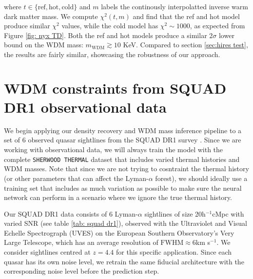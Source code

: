 where $t\in \{\mathrm{ref}, \mathrm{hot}, \mathrm{cold} \}$ and $m$ labels the continously interpolatted inverse warm dark matter mass. We compute $\chi^2(t,m)$ and find that the ref and hot model produce similar $\chi^2$ values, while the cold model has $\chi^2 \sim 1000$, as expected from Figure \ref{fig: nyx TD}. Both the ref and hot models produce a similar $2\sigma$ lower bound on the WDM mass: $m_{\mathrm{WDM}} \gtrsim 10$ KeV. Compared to section \ref{sec:hires test}, the results are fairly similar, showcasing the robustness of our approach.
































\section{WDM constraints from SQUAD DR1 observational data}\label{sec:inference squad}
We begin applying our density recovery and WDM mass inference pipeline to a set of 6 observed quasar sightlines from the SQUAD DR1 survey \cite{Murphy_2018}. Since we are working with observational data, we will always train the model with the complete \texttt{SHERWOOD THERMAL} dataset that includes varied thermal histories and WDM masses. Note that since we are not trying to cosntraint the thermal history (or other parameters that can affect the Lyman-$\alpha$ forest), we should ideally use a training set that includes as much variation as possible to make sure the neural network can perform in a scenario where we ignore the true thermal history.

Our SQUAD DR1  data consists of 6 Lyman-$\alpha$ sightlines of size 20h$^{-1}$cMpc with varied SNR (see table \ref{tab: squad dr1}), observed with the Ultraviolet and Visual Echelle Spectrograph (UVES) on the European Southern Observatory’s Very Large Telescope, which has an average resolution of $\mathrm{FWHM}\approx 6$km s$^{-1}$. We consider sightlines centred at $z=4.4$ for this specific application. Since each quasar has its own noise level, we retrain the same fiducial architecture with the corresponding noise level before the prediction step.

